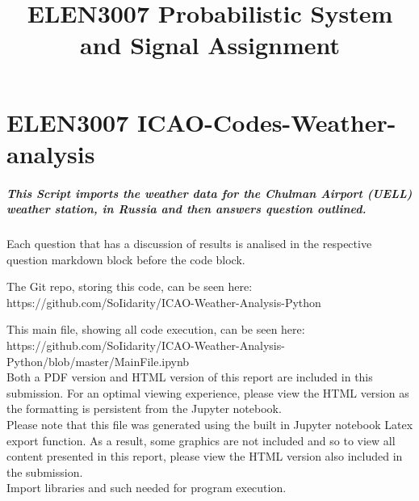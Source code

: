 \documentclass[11pt]{article}
\title{ELEN3007 Probabilistic System and Signal Assignment}
\begin{document}
    
    
    \maketitle
    
    

    
    \section{ELEN3007
ICAO-Codes-Weather-analysis}\label{elen3007-icao-codes-weather-analysis}

\subparagraph{This Script imports the weather data for the Chulman
Airport (UELL) weather station, in Russia and then answers question
outlined.}\label{this-script-imports-the-weather-data-for-the-chulman-airport-uell-weather-station-in-russia-and-then-answers-question-outlined.}

Each question that has a discussion of results is analised in the
respective question markdown block before the code block.

The Git repo, storing this code, can be seen here:
https://github.com/SoIidarity/ICAO-Weather-Analysis-Python

This main file, showing all code execution, can be seen here:
https://github.com/SoIidarity/ICAO-Weather-Analysis-Python/blob/master/MainFile.ipynb
\\

Both a PDF version and HTML version of this report are included in this
submission. For an optimal viewing experience, please view the HTML
version as the formatting is persistent from the Jupyter notebook.
\\

Please note that this file was generated using the built in Jupyter notebook Latex export function. As a result, some graphics are not included and so to view all content presented in this report, please view the HTML version also included in the submission.
\\

    Import libraries and such needed for program execution.
\end{document}
